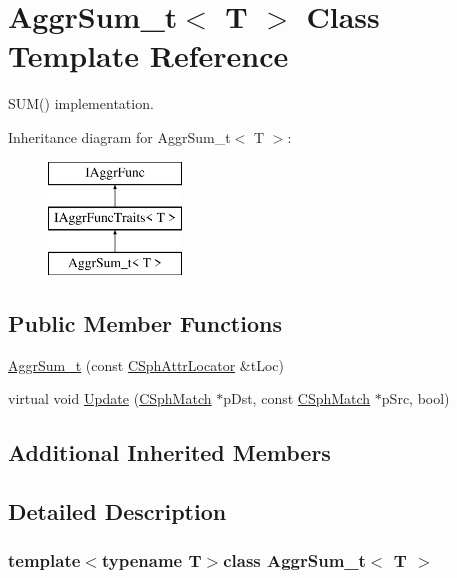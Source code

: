 \hypertarget{classAggrSum__t}{\section{Aggr\-Sum\-\_\-t$<$ T $>$ Class Template Reference}
\label{classAggrSum__t}
}


S\-U\-M() implementation.  


Inheritance diagram for Aggr\-Sum\-\_\-t$<$ T $>$\-:\begin{figure}[H]
\begin{center}
\leavevmode
\includegraphics[height=3.000000cm]{classAggrSum__t}
\end{center}
\end{figure}
\subsection*{Public Member Functions}
\begin{DoxyCompactItemize}
\item 
\hyperlink{classAggrSum__t_a85fea277edb47c376b8044584f91b191}{Aggr\-Sum\-\_\-t} (const \hyperlink{structCSphAttrLocator}{C\-Sph\-Attr\-Locator} \&t\-Loc)
\item 
virtual void \hyperlink{classAggrSum__t_a35ae33db594f1cc249f72f8b6217cd44}{Update} (\hyperlink{classCSphMatch}{C\-Sph\-Match} $\ast$p\-Dst, const \hyperlink{classCSphMatch}{C\-Sph\-Match} $\ast$p\-Src, bool)
\end{DoxyCompactItemize}
\subsection*{Additional Inherited Members}


\subsection{Detailed Description}
\subsubsection*{template$<$typename T$>$class Aggr\-Sum\-\_\-t$<$ T $>$}

